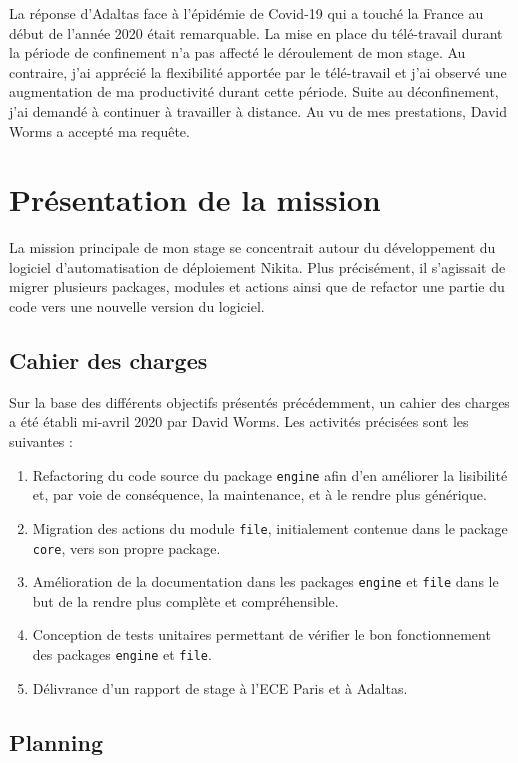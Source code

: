 \documentclass[12pt, french]{report}
\begin{document}
La réponse d'Adaltas face à l'épidémie de Covid-19 qui a touché la France au début de l'année 2020 était remarquable. La mise en place du télé-travail durant la période de confinement n'a pas affecté le déroulement de mon stage. Au contraire, j'ai apprécié la flexibilité apportée par le télé-travail et j'ai observé une augmentation de ma productivité durant cette période. Suite au déconfinement, j'ai demandé à continuer à travailler à distance. Au vu de mes prestations, David Worms a accepté ma requête.

\chapter{Présentation de la mission}

La mission principale de mon stage se concentrait autour du développement du logiciel d'automatisation de déploiement Nikita. Plus précisément, il s'agissait de migrer plusieurs packages, modules et actions ainsi que de refactor une partie du code vers une nouvelle version du logiciel.

\section{Cahier des charges}

Sur la base des différents objectifs présentés précédemment, un cahier des charges a été établi mi-avril 2020 par David Worms. Les activités précisées sont les suivantes : 

\begin{enumerate}
  \item Refactoring du code source du package \texttt{engine} afin d'en améliorer la lisibilité et, par voie de conséquence, la maintenance, et à le rendre plus générique.
  \item Migration des actions du module \texttt{file}, initialement contenue dans le package \texttt{core}, vers son propre package.
  \item Amélioration de la documentation dans les packages \texttt{engine} et \texttt{file} dans le but de la rendre plus complète et compréhensible.
  \item Conception de tests unitaires permettant de vérifier le bon fonctionnement des packages \texttt{engine} et \texttt{file}.
  \item Délivrance d'un rapport de stage à l'ECE Paris et à Adaltas.
\end{enumerate}

\section{Planning}
\end{document}
